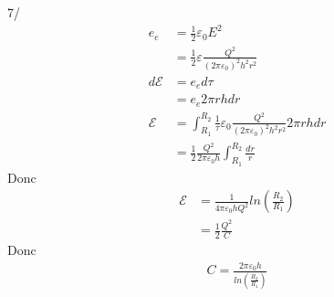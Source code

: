 \documentclass[a4paper]{article}
\begin{document}
7/ \begin{align*}
    e_e &= \frac{1}{2}\varepsilon_0 E^2\\
    &= \frac{1}{2} \varepsilon \frac{Q^2}{(2\pi \varepsilon_0)^2 h^2 r^2}\\
    d\mathcal{E} &= e_e d\tau\\
    &= e_e 2\pi rhdr \\
    \mathcal{E} &= \int_{R_1}^{R_2} \frac{1}{\tau} \varepsilon_0 \frac{Q^2}{(2\pi\varepsilon_0)^2h^2r^2}2\pi rhdr\\
    &= \frac{1}{2}\frac{Q^2}{2\pi\varepsilon_0 h}\int_{R_1}^{R_2} \frac{dr}{r}
\end{align*}
Donc \begin{align*}
    \mathcal{E}&= \frac{1}{4\pi\varepsilon_0h Q^2}ln(\frac{R_2}{R_1})\\
    &= \frac{1}{2}\frac{Q^2}{C}
\end{align*}
Donc \begin{align*}
    C = \frac{2\pi\varepsilon_0 h}{ln(\frac{R_2}{R_1})}
\end{align*}
\end{document}
